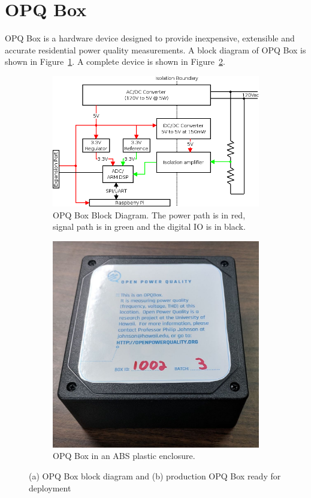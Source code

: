 \section{OPQ Box}
\label{sec:opq-box}

OPQ Box is a hardware device designed to provide inexpensive, extensible and accurate residential power quality measurements.
A block diagram of OPQ Box is shown in Figure~\ref{fig:opq:1:1}.
A complete device is shown in Figure~\ref{fig:opq:1:2}.

\begin{figure}[ht]
	\centering
	\begin{subfigure}{.5\textwidth}
	  \centering
	  \includegraphics[width=0.9\linewidth]{images/opq-box/opqbox_diagram.png}
	  \caption{OPQ Box Block Diagram.
	  The power path is in red, signal path is in green and the digital IO is in black.}
	  \label{fig:opq:1:1}
	\end{subfigure}%
	\begin{subfigure}{.5\textwidth}
	  \centering
	  \includegraphics[width=0.7\linewidth]{images/opq-box/opqbox_photo.jpg}
	  \caption{OPQ Box in an ABS plastic enclosure.}
	  \label{fig:opq:1:2}
	\end{subfigure}
	\caption{(a) OPQ Box block diagram and (b) production OPQ Box ready for deployment}
	\label{fig:opq:2}
\end{figure}

